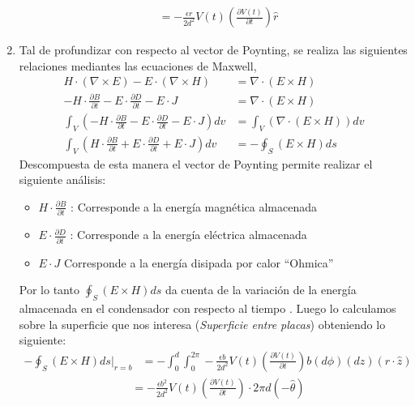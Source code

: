 \documentclass[
  11pt,
  letterpaper,
   addpoints,
   answers
  ]{exam}
\begin{document}
\begin{questions}
\begin{solution}
\begin{enumerate}
\begin{align}
                &= - \frac{\epsilon r}{2d^{2}} V(t) \left(\frac{\partial V(t)}{\partial t}\right) \hat{r}
            \end{align}
            \item Tal de profundizar con respecto al vector de Poynting, se realiza las siguientes relaciones mediantes las ecuaciones de Maxwell,
            {\small
            \begin{align}
               H\cdot (\nabla \times E ) - E \cdot (\nabla \times H) &= \nabla \cdot (E \times H)\\
               -H \cdot \frac{\partial B}{\partial t} - E \cdot \frac{\partial D}{\partial t} - E \cdot J  &=  \nabla \cdot (E \times H)\\
               \int_{V} \left( -H \cdot \frac{\partial B}{\partial t} - E \cdot \frac{\partial D}{\partial t} - E \cdot J \right) dv &= \int_{V} \left( \nabla \cdot (E \times H) \right) dv\\
               \int_{V} \left( H \cdot \frac{\partial B}{\partial t} + E \cdot \frac{\partial D}{\partial t}+ E \cdot J \right) dv &= -\oint_S \left(E \times H \right) ds
            \end{align}
            }
            Descompuesta de esta manera el vector de Poynting permite realizar el siguiente análisis:
            \begin{itemize}
                \item $H \cdot \frac{\partial B}{\partial t}$ : Corresponde a la energía magnética almacenada 
                \item $E \cdot \frac{\partial D}{\partial t}$ : Corresponde a la energía eléctrica almacenada
                \item $ E \cdot J $ Corresponde a la energía disipada por calor ``Ohmica''
            \end{itemize}
            Por lo tanto $\oint_S \left(E \times H \right) ds$ da cuenta de la variación de la energía almacenada en el condensador con respecto al tiempo . Luego lo calculamos sobre la superficie que nos interesa (\textit{Superficie entre placas}) obteniendo lo siguiente:
            {\small
            \begin{align}
                -\oint_{S} (E\times H)ds |_{r=b} &= -\int_{0}^{d} \int_{0}^{2\pi} -\frac{\epsilon b}{2d^{2}}V(t) \left(\frac{\partial V(t)}{\partial t} \right) b (d\phi)(dz) (\hat{r} \cdot \hat{z})
            \end{align}}
            \begin{align}
                &=  -\frac{\epsilon b^{2}}{2d^{2}}V(t) \left(\frac{\partial V(t)}{\partial t}\right) \cdot 2\pi d (-\hat{\theta})\\

\end{align}
\end{enumerate}
\end{solution}
\end{questions}
\end{document}
